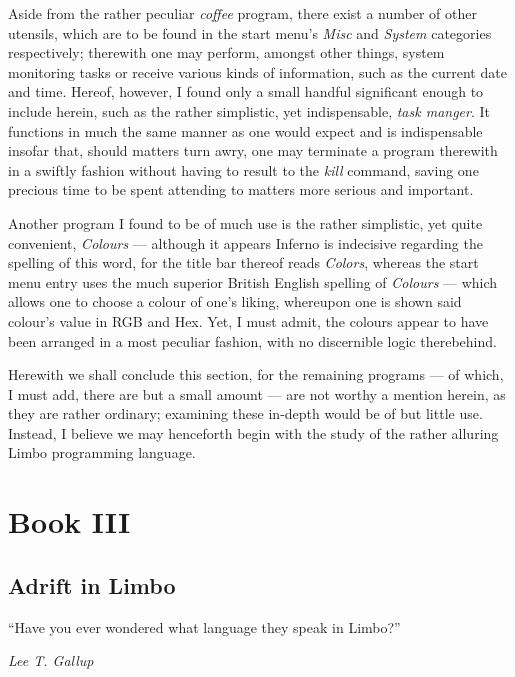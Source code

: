 \documentclass[a5paper,twoside,12pt]{report}
\begin{document}
  Aside from the rather peculiar \textit{coffee} program, there exist a number of other utensils, which are to be found in the start menu's \textit{Misc} and \textit{System} categories respectively; therewith one may perform, amongst other things, system monitoring tasks or receive various kinds of information, such as the current date and time. Hereof, however, I found only a small handful significant enough to include herein, such as the rather simplistic, yet indispensable, \textit{task manger}. It functions in much the same manner as one would expect and is indispensable insofar that, should matters turn awry, one may terminate a program therewith in a swiftly fashion without having to result to the \textit{kill} command, saving one precious time to be spent attending to matters more serious and important.
  
  Another program I found to be of much use is the rather simplistic, yet quite convenient, \textit{Colours} — although it appears Inferno is indecisive regarding the spelling of this word, for the title bar thereof reads \textit{Colors}, whereas the start menu entry uses the much superior British English spelling of \textit{Colours} — which allows one to choose a colour of one's liking, whereupon one is shown said colour's value in RGB and Hex. Yet, I must admit, the colours appear to have been arranged in a most peculiar fashion, with no discernible logic therebehind.

  Herewith we shall conclude this section, for the remaining programs — of which, I must add, there are but a small amount — are not worthy a mention herein, as they are rather ordinary; examining these in-depth would be of but little use. Instead, I believe we may henceforth begin with the study  of the rather alluring Limbo programming language.  \newpage

\part*{Book III}
  \newpage

\thispagestyle{empty}
  \mbox{}
  \newpage

\chapter*{Adrift in Limbo}

\epigraph{``Have you ever wondered what language they speak in Limbo?''}{\textit{Lee T. Gallup}}
\end{document}
